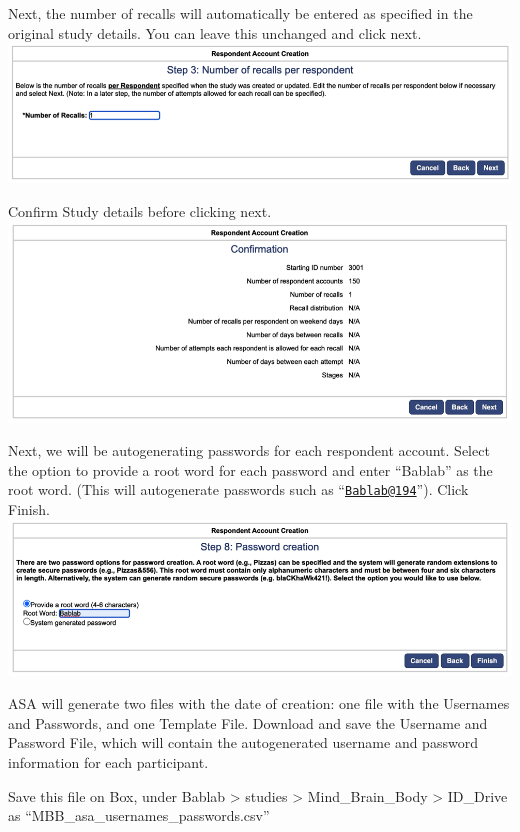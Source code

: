 \documentclass[]{book}
\begin{document}
Next, the number of recalls will automatically be entered as specified in the original study details. You can leave this unchanged and click next.
\includegraphics{images/research_protocols/asa/asa_6.png}

Confirm Study details before clicking next.
\includegraphics{images/research_protocols/asa/asa_7.png}

Next, we will be autogenerating passwords for each respondent account. Select the option to provide a root word for each password and enter ``Bablab'' as the root word. (This will autogenerate passwords such as ``\href{mailto:Bablab@194}{\nolinkurl{Bablab@194}}''). Click Finish.
\includegraphics{images/research_protocols/asa/asa_8.png}

ASA will generate two files with the date of creation: one file with the Usernames and Passwords, and one Template File. Download and save the Username and Password File, which will contain the autogenerated username and password information for each participant.

Save this file on Box, under Bablab \textgreater{} studies \textgreater{} Mind\_Brain\_Body \textgreater{} ID\_Drive as ``MBB\_asa\_usernames\_passwords.csv''
\end{document}
